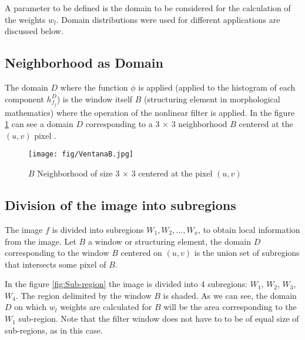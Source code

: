 A parameter to be defined is the domain to be considered for the calculation of the weights $w_l$. Domain distributions were used for different applications are discussed below.

\subsection{Neighborhood as Domain}
The domain $D$ where the function $\phi$  is applied  (applied to the histogram of each component $h_{f_j}^D$) is the window itself $B$ (structuring element in morphological mathematics) where the operation of the nonlinear filter is applied. In the figure \ref{fig:Ventana B} can see a domain $D$ corresponding to a  3 $\times$ 3 neighborhood $B$ centered at the $(u,v)$ pixel .

\begin{figure}
	\centering
		\texttt{[image: fig/VentanaB.jpg]}
	\caption{$B$ Neighborhood of size 3 $\times$ 3 centered at the pixel $(u,v)$ }
	\label{fig:Ventana B}
\end{figure}

\subsection{Division of the image into subregions}

The image $f$ is divided into subregions $W_1,W_2,\dots, W_{x}$, to obtain local information from the image.
Let $B$ a window or structuring element, the domain $D$ corresponding to the window $B$ centered on $(u,v)$ is the union set of subregions that intersects some pixel of $B$.

In the figure \ref{fig:Sub-region} the image is divided into 4 subregions: $W_1$, $W_2$, $W_3$, $W_4$.  The region delimited by the window $B$ is shaded. As we can see, the domain $D$ on which $w_l$ weights are calculated for $B$ will be the area corresponding to the $W_1$ sub-region. Note that the filter window does not have to to be of equal size of sub-regions, as in this case. 
 


